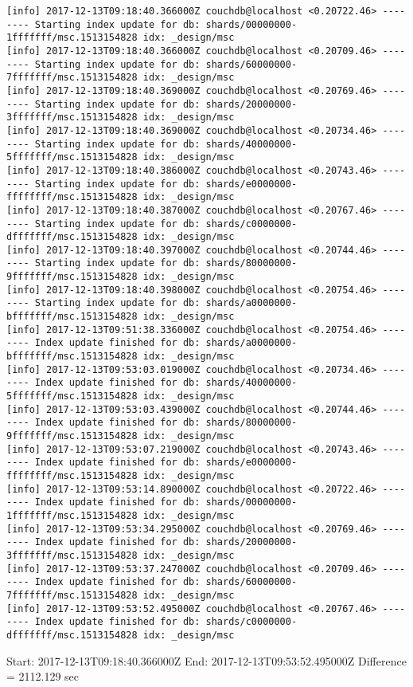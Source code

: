 \begin{verbatim}
[info] 2017-12-13T09:18:40.366000Z couchdb@localhost <0.20722.46> -------- Starting index update for db: shards/00000000-1fffffff/msc.1513154828 idx: _design/msc
[info] 2017-12-13T09:18:40.366000Z couchdb@localhost <0.20709.46> -------- Starting index update for db: shards/60000000-7fffffff/msc.1513154828 idx: _design/msc
[info] 2017-12-13T09:18:40.369000Z couchdb@localhost <0.20769.46> -------- Starting index update for db: shards/20000000-3fffffff/msc.1513154828 idx: _design/msc
[info] 2017-12-13T09:18:40.369000Z couchdb@localhost <0.20734.46> -------- Starting index update for db: shards/40000000-5fffffff/msc.1513154828 idx: _design/msc
[info] 2017-12-13T09:18:40.386000Z couchdb@localhost <0.20743.46> -------- Starting index update for db: shards/e0000000-ffffffff/msc.1513154828 idx: _design/msc
[info] 2017-12-13T09:18:40.387000Z couchdb@localhost <0.20767.46> -------- Starting index update for db: shards/c0000000-dfffffff/msc.1513154828 idx: _design/msc
[info] 2017-12-13T09:18:40.397000Z couchdb@localhost <0.20744.46> -------- Starting index update for db: shards/80000000-9fffffff/msc.1513154828 idx: _design/msc
[info] 2017-12-13T09:18:40.398000Z couchdb@localhost <0.20754.46> -------- Starting index update for db: shards/a0000000-bfffffff/msc.1513154828 idx: _design/msc
[info] 2017-12-13T09:51:38.336000Z couchdb@localhost <0.20754.46> -------- Index update finished for db: shards/a0000000-bfffffff/msc.1513154828 idx: _design/msc
[info] 2017-12-13T09:53:03.019000Z couchdb@localhost <0.20734.46> -------- Index update finished for db: shards/40000000-5fffffff/msc.1513154828 idx: _design/msc
[info] 2017-12-13T09:53:03.439000Z couchdb@localhost <0.20744.46> -------- Index update finished for db: shards/80000000-9fffffff/msc.1513154828 idx: _design/msc
[info] 2017-12-13T09:53:07.219000Z couchdb@localhost <0.20743.46> -------- Index update finished for db: shards/e0000000-ffffffff/msc.1513154828 idx: _design/msc
[info] 2017-12-13T09:53:14.890000Z couchdb@localhost <0.20722.46> -------- Index update finished for db: shards/00000000-1fffffff/msc.1513154828 idx: _design/msc
[info] 2017-12-13T09:53:34.295000Z couchdb@localhost <0.20769.46> -------- Index update finished for db: shards/20000000-3fffffff/msc.1513154828 idx: _design/msc
[info] 2017-12-13T09:53:37.247000Z couchdb@localhost <0.20709.46> -------- Index update finished for db: shards/60000000-7fffffff/msc.1513154828 idx: _design/msc
[info] 2017-12-13T09:53:52.495000Z couchdb@localhost <0.20767.46> -------- Index update finished for db: shards/c0000000-dfffffff/msc.1513154828 idx: _design/msc
\end{verbatim}

Start: 2017-12-13T09:18:40.366000Z
End: 2017-12-13T09:53:52.495000Z
Difference = 2112.129 sec

